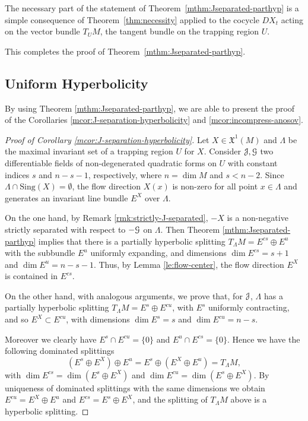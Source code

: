 \documentclass[12pt,reqno]{amsart}
\numberwithin{equation}{section}
\theoremstyle{plain}
\theoremstyle{definition}
\newcommand{\sing}{\mathrm{Sing}}
\newcommand{\G}{\EuScript{G}}
\newcommand{\J}{\EuScript{J}}
\newcommand{\Mundo}{\mathfrak{X}^{1}(M)}
\begin{document}
The necessary part of the statement of
Theorem~\ref{mthm:Jseparated-parthyp} is a simple
consequence of Theorem~\ref{thm:necessity} applied to the
cocycle $DX_t$ acting on the vector bundle $T_UM$, the
tangent bundle on the trapping region $U$.

This completes the proof of
Theorem~\ref{mthm:Jseparated-parthyp}.

\subsection{Uniform Hyperbolicity}
\label{sec:uniform-hyperb}

By using Theorem \ref{mthm:Jseparated-parthyp}, we are able
to present the proof of the Corollaries
\ref{mcor:J-separation-hyperbolicity} and
\ref{mcor:incompress-anosov}.

\begin{proof}[Proof of Corollary \ref{mcor:J-separation-hyperbolicity}]
  Let $X \in \Mundo$ and $\Lambda$ be the maximal invariant
  set of a trapping region $U$ for $X$.  Consider $\J, \G$
  two differentiable fields of non-degenerated quadratic
  forms on $U$ with constant indices $s$ and $n - s- 1$,
  respectively, where $n = \dim M$ and $s < n - 2$.  Since
  $\Lambda \cap \sing(X) = \emptyset$, the flow direction
  $X(x)$ is non-zero for all point $x \in \Lambda$ and
  generates an invariant line bundle $E^X$ over
  $\Lambda$. %

  On the one hand, by Remark \ref{rmk:strictly-J-separated},
  $- X$ is a non-negative strictly separated with respect to
  $- \G$ on $\Lambda$. Then Theorem
  \ref{mthm:Jseparated-parthyp} implies that there is a
  partially hyperbolic splitting $T_\Lambda M=E^{cs} \oplus
  E^{u}$ with the subbundle $E^u$ uniformly expanding, and
  dimensions $\dim E^{cs}=s+1$ and $\dim E^u=n-s-1$. Thus,
  by Lemma \ref{le:flow-center}, the flow direction $E^X$ is
  contained in $E^{cs}$.

  On the other hand, with analogous arguments, we prove
  that, for $\J$, $\Lambda$ has a partially hyperbolic
  splitting $T_\Lambda M=E^s \oplus E^{cu}$, with $E^s$
  uniformly contracting, and so $E^X \subset E^{cu}$, with
  dimensions $\dim E^s=s$ and $\dim E^{cu}=n-s$.

  Moreover we clearly have $E^s\cap E^{cu}=\{0\}$ and
  $E^u\cap E^{cs}=\{0\}$.  Hence we have the following
  dominated splittings
$$
(E^{s}\oplus E^{X}) \oplus E^{u} = E^{s}\oplus (E^{X} \oplus
E^{u}) = T_{\Lambda}M,
$$
with $\dim E^{cs} = \dim (E^{s}\oplus E^X)$ and $\dim E^{cu}
= \dim (E^{s}\oplus E^X)$. By uniqueness of dominated
splittings with the same dimensions we obtain
$E^{cu}=E^X\oplus E^u$ and $E^{cs}=E^s\oplus E^X$, and the
splitting of $T_\Lambda M$ above is a hyperbolic splitting.
\end{proof}
\end{document}
